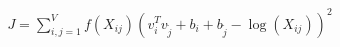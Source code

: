 \documentclass[preview]{standalone}
\begin{document}
\begin{align*}
J = \sum_{i,j=1}^{V} f(X_{ij}) (v_i^T v_{\tilde{j}} + b_i + b_{\tilde{j}} - \log(X_{ij}))^2
\end{align*}
\end{document}
